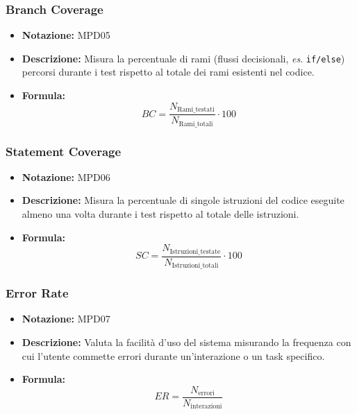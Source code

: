 \documentclass[a4paper,12pt]{article}
\begin{document}
        \subsubsection{Branch Coverage}
            \begin{itemize}
                \item \textbf{Notazione:} MPD05
                \item \textbf{Descrizione:} Misura la percentuale di rami (flussi decisionali, \textit{es}. \verb|if/else|) percorsi durante i test rispetto al totale dei rami esistenti nel codice.
                \item \textbf{Formula:} 
                \[ BC = \frac{N_\text{Rami\_testati}}{N_\text{Rami\_totali}} \cdot 100 \]
            \end{itemize}

        \subsubsection{Statement Coverage}
            \begin{itemize}
                \item \textbf{Notazione:} MPD06
                \item \textbf{Descrizione:} Misura la percentuale di singole istruzioni del codice eseguite almeno una volta durante i test rispetto al totale delle istruzioni.
                \item \textbf{Formula:} 
                \[ SC = \frac{N_\text{Istruzioni\_testate}}{N_\text{Istruzioni\_totali}} \cdot 100 \]
            \end{itemize}

        \subsubsection{Error Rate}
            \begin{itemize}
                \item \textbf{Notazione:} MPD07
                \item \textbf{Descrizione:} Valuta la facilità d'uso del sistema misurando la frequenza con cui l'utente commette errori durante un'interazione o un task specifico.
                \item \textbf{Formula:} 
                \[ ER = \frac{N_\text{errori}}{N_\text{interazioni}} \]
            \end{itemize}
\end{document}
